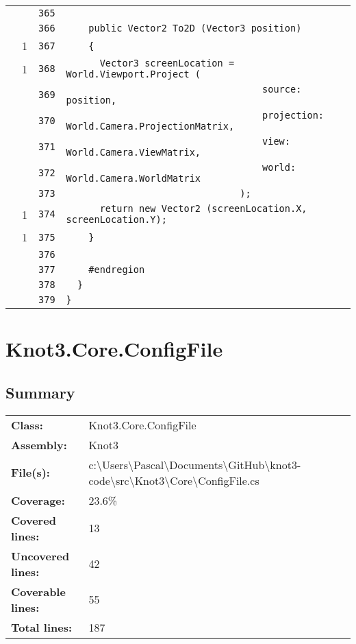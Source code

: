 \documentclass[a4paper,10pt]{article}
\begin{document}
\begin{longtable}[l]{lrrl}
\cellcolor{gray} &  & \verb~365~ & \verb~~\\
\cellcolor{gray} &  & \verb~366~ & \verb~    public Vector2 To2D (Vector3 position)~\\
\cellcolor{green} & 1 & \verb~367~ & \verb~    {~\\
\cellcolor{green} & 1 & \verb~368~ & \verb~      Vector3 screenLocation = World.Viewport.Project (~\\
\cellcolor{gray} &  & \verb~369~ & \verb~                                   source: position,~\\
\cellcolor{gray} &  & \verb~370~ & \verb~                                   projection: World.Camera.ProjectionMatrix,~\\
\cellcolor{gray} &  & \verb~371~ & \verb~                                   view: World.Camera.ViewMatrix,~\\
\cellcolor{gray} &  & \verb~372~ & \verb~                                   world: World.Camera.WorldMatrix~\\
\cellcolor{gray} &  & \verb~373~ & \verb~                               );~\\
\cellcolor{green} & 1 & \verb~374~ & \verb~      return new Vector2 (screenLocation.X, screenLocation.Y);~\\
\cellcolor{green} & 1 & \verb~375~ & \verb~    }~\\
\cellcolor{gray} &  & \verb~376~ & \verb~~\\
\cellcolor{gray} &  & \verb~377~ & \verb~    #endregion~\\
\cellcolor{gray} &  & \verb~378~ & \verb~  }~\\
\cellcolor{gray} &  & \verb~379~ & \verb~}~\\
\end{longtable}
\newpage
\section{Knot3.Core.ConfigFile}
\subsection{Summary}
\begin{longtable}[l]{ll}
\textbf{Class:} & Knot3.Core.ConfigFile\\
\textbf{Assembly:} & Knot3\\
\textbf{File(s):} & \begin{minipage}[t]{12cm}{c:\textbackslash Users\textbackslash Pascal\textbackslash Documents\textbackslash GitHub\textbackslash knot3-code\textbackslash src\textbackslash Knot3\textbackslash Core\textbackslash ConfigFile.cs}\end{minipage} \\
\textbf{Coverage:} & 23.6\%\\
\textbf{Covered lines:} & 13\\
\textbf{Uncovered lines:} & 42\\
\textbf{Coverable lines:} & 55\\
\textbf{Total lines:} & 187\\
\end{longtable}
\end{document}
